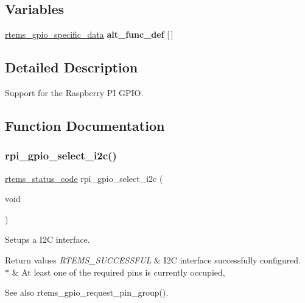 \subsection*{Variables}
\begin{DoxyCompactItemize}
\item 
\mbox{\hyperlink{structrtems__gpio__specific__data}{rtems\+\_\+gpio\+\_\+specific\+\_\+data}} {\bfseries alt\+\_\+func\+\_\+def} \mbox{[}$\,$\mbox{]}
\end{DoxyCompactItemize}


\subsection{Detailed Description}
Support for the Raspberry PI G\+P\+IO. 



\subsection{Function Documentation}
\mbox{\label{rpi-gpio_8c_adf19e397f4bfdb38d6d75a604e7373d1}} 
\subsubsection{\texorpdfstring{rpi\_gpio\_select\_i2c()}{rpi\_gpio\_select\_i2c()}}
{\footnotesize\ttfamily \mbox{\hyperlink{group__ClassicStatus_ga545d41846817eaba6143d52ee4d9e9fe}{rtems\+\_\+status\+\_\+code}} rpi\+\_\+gpio\+\_\+select\+\_\+i2c (\begin{DoxyParamCaption}\item[{void}]{ }\end{DoxyParamCaption})}



Setups a I2C interface. 


\begin{DoxyRetVals}{Return values}
{\em R\+T\+E\+M\+S\+\_\+\+S\+U\+C\+C\+E\+S\+S\+F\+UL} & I2C interface successfully configured. \\
\hline
{\em $\ast$} & At least one of the required pins is currently occupied, \\
\hline
\end{DoxyRetVals}
\begin{DoxySeeAlso}{See also}
rtems\+\_\+gpio\+\_\+request\+\_\+pin\+\_\+group(). 
\end{DoxySeeAlso}
\mbox{\label{rpi-gpio_8c_ab31aee23a17b307e47076c1877f5736e}} 
